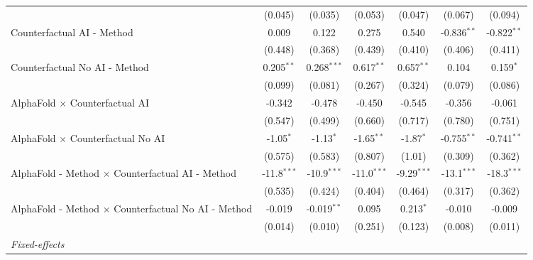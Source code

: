 \begin{tabular}{lcccccc}
                                                              & (0.045)       & (0.035)       & (0.053)       & (0.047)       & (0.067)       & (0.094)\\   
   Counterfactual AI - Method                                 & 0.009         & 0.122         & 0.275         & 0.540         & -0.836$^{**}$ & -0.822$^{**}$\\   
                                                              & (0.448)       & (0.368)       & (0.439)       & (0.410)       & (0.406)       & (0.411)\\   
   Counterfactual No AI - Method                              & 0.205$^{**}$  & 0.268$^{***}$ & 0.617$^{**}$  & 0.657$^{**}$  & 0.104         & 0.159$^{*}$\\   
                                                              & (0.099)       & (0.081)       & (0.267)       & (0.324)       & (0.079)       & (0.086)\\   
   AlphaFold $\times$ Counterfactual AI                       & -0.342        & -0.478        & -0.450        & -0.545        & -0.356        & -0.061\\   
                                                              & (0.547)       & (0.499)       & (0.660)       & (0.717)       & (0.780)       & (0.751)\\   
   AlphaFold $\times$ Counterfactual No AI                    & -1.05$^{*}$   & -1.13$^{*}$   & -1.65$^{**}$  & -1.87$^{*}$   & -0.755$^{**}$ & -0.741$^{**}$\\   
                                                              & (0.575)       & (0.583)       & (0.807)       & (1.01)        & (0.309)       & (0.362)\\   
   AlphaFold - Method $\times$ Counterfactual AI - Method     & -11.8$^{***}$ & -10.9$^{***}$ & -11.0$^{***}$ & -9.29$^{***}$ & -13.1$^{***}$ & -18.3$^{***}$\\   
                                                              & (0.535)       & (0.424)       & (0.404)       & (0.464)       & (0.317)       & (0.362)\\   
   AlphaFold - Method $\times$ Counterfactual No AI - Method  & -0.019        & -0.019$^{**}$ & 0.095         & 0.213$^{*}$   & -0.010        & -0.009\\   
                                                              & (0.014)       & (0.010)       & (0.251)       & (0.123)       & (0.008)       & (0.011)\\   
   \midrule
   \emph{Fixed-effects}\\

\end{tabular}
